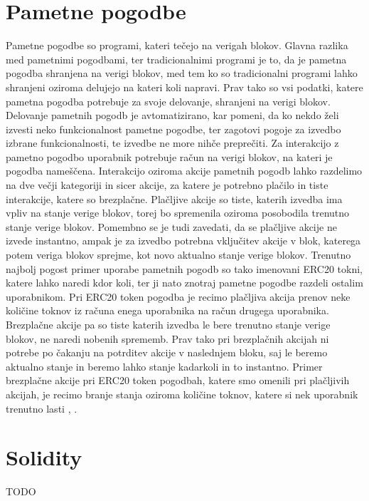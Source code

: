\documentclass[a4paper,12pt,openright]{book}
\begin{document}
\section{Pametne pogodbe}
Pametne pogodbe so programi, kateri tečejo na verigah blokov.
Glavna razlika med pametnimi pogodbami, ter tradicionalnimi programi je to, da je pametna pogodba shranjena na verigi blokov, med tem ko so tradicionalni programi lahko shranjeni oziroma delujejo na kateri koli napravi.
Prav tako so vsi podatki, katere pametna pogodba potrebuje za svoje delovanje, shranjeni na verigi blokov.
Delovanje pametnih pogodb je avtomatizirano, kar pomeni, da ko nekdo želi izvesti neko funkcionalnost pametne pogodbe, ter zagotovi pogoje za izvedbo izbrane funkcionalnosti, te izvedbe ne more nihče preprečiti.
Za interakcijo z pametno pogodbo uporabnik potrebuje račun na verigi blokov, na kateri je pogodba nameščena.
Interakcijo oziroma akcije pametnih pogodb lahko razdelimo na dve večji kategoriji in sicer akcije, za katere je potrebno plačilo in tiste interakcije, katere so brezplačne.
Plačljive akcije so tiste, katerih izvedba ima vpliv na stanje verige blokov, torej bo spremenila oziroma posobodila trenutno stanje verige blokov.
Pomembno se je tudi zavedati, da se plačljive akcije ne izvede instantno, ampak je za izvedbo potrebna vključitev akcije v blok, katerega potem veriga blokov sprejme, kot novo aktualno stanje verige blokov.
Trenutno najbolj pogost primer uporabe pametnih pogodb so tako imenovani ERC20 tokni, katere lahko naredi kdor koli, ter ji nato znotraj pametne pogodbe razdeli ostalim uporabnikom. Pri ERC20 token pogodba je recimo plačljiva akcija prenov neke količine toknov iz računa enega uporabnika na račun drugega uporabnika.
Brezplačne akcije pa so tiste katerih izvedba le bere trenutno stanje verige blokov, ne naredi nobenih sprememb.
Prav tako pri brezplačnih akcijah ni potrebe po čakanju na potrditev akcije v naslednjem bloku, saj le beremo aktualno stanje in beremo lahko stanje kadarkoli in to instantno.
Primer brezplačne akcije pri ERC20 token pogodbah, katere smo omenili pri plačljivih akcijah, je recimo branje stanja oziroma količine toknov, katere si nek uporabnik trenutno lasti \cite{eth_smart_contract_intro}, \cite{erc20_token_standard}.

\section{Solidity}
TODO
\end{document}
